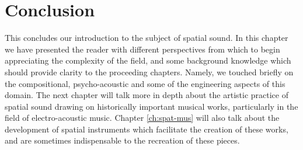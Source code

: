 

\section{Conclusion}
This concludes our introduction to the subject of spatial sound. In this chapter we have presented the reader with different perspectives from which to begin appreciating the complexity of the field, and some background knowledge which should provide clarity to the proceeding chapters. Namely, we touched briefly on the compositional, psycho-acoustic and some of the engineering aspects of this domain. The next chapter will talk more in depth about the artistic practice of spatial sound drawing on historically important musical works, particularly in the field of electro-acoustic music. Chapter \ref{ch:spat-mus} will also talk about the development of spatial instruments which facilitate the creation of these works, and are sometimes indispensable to the recreation of these pieces.